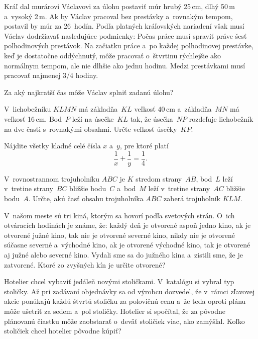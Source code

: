 {%
Kráľ dal murárovi Václavovi za úlohu postaviť múr hrubý 25\,cm, dlhý 50\,m a~vysoký 2\,m. Ak by Václav pracoval bez prestávky a~rovnakým tempom, postavil by múr za 26~hodín. Podľa platných kráľovských nariadení však musí Václav dodržiavať nasledujúce podmienky:
\itemitem{$\bullet$}
Počas práce musí spraviť práve šesť polhodinových prestávok.
\itemitem{$\bullet$}
Na začiatku práce a~po každej polhodinovej prestávke, keď je dostatočne oddýchnutý, môže pracovať o~štvrtinu rýchlejšie ako normálnym tempom, ale nie dlhšie ako jednu hodinu.
\itemitem{$\bullet$}
Medzi prestávkami musí pracovať najmenej 3/4 hodiny.

Za aký najkratší čas môže Václav splniť zadanú úlohu?
}

{%
V~lichobežníku $KLMN$ má základňa~$KL$ veľkosť 40\,cm a~základňa~$MN$ má veľkosť 16\,cm. Bod~$P$ leží na úsečke~$KL$ tak, že úsečka~$NP$ rozdeľuje lichobežník na dve časti s~rovnakými obsahmi. Určte veľkosť úsečky~$KP$.
}

{%
Nájdite všetky kladné celé čísla $x$ a~$y$, pre ktoré platí
$$
\frac1x+\frac1y=\frac14.
$$
}

{%
V~rovnostrannom trojuholníku $ABC$ je $K$ stredom strany~$AB$, bod~$L$ leží v~tretine strany~$BC$ bližšie bodu~$C$ a~bod~$M$ leží v~tretine strany~$AC$ bližšie bodu~$A$. Určte, akú časť obsahu trojuholníka $ABC$ zaberá trojuholník $KLM$.}

{%
V~našom meste sú tri kiná, ktorým sa hovorí podľa svetových strán. O~ich otváracích hodinách je známe, že:
\itemitem{$\bullet$}
každý deň je otvorené aspoň jedno kino,
\itemitem{$\bullet$}
ak je otvorené južné kino, tak nie je otvorené severné kino,
\itemitem{$\bullet$}
nikdy nie je otvorené súčasne severné a~východné kino,
\itemitem{$\bullet$}
ak je otvorené východné kino, tak je otvorené aj južné alebo severné kino.\endgraf
\noindent
Vydali sme sa do južného kina a~zistili sme, že je zatvorené. Ktoré zo zvyšných kín je určite otvorené?
}

{%
Hotelier chcel vybaviť jedáleň novými stoličkami. V~katalógu si vybral typ stoličky. Až pri zadávaní objednávky sa od výrobcu dozvedel, že v~rámci zľavovej akcie ponúkajú každú štvrtú stoličku za polovičnú cenu a~že teda oproti plánu môže ušetriť za sedem a~pol stoličky. Hotelier si spočítal, že za pôvodne plánovanú čiastku môže zaobstarať o~deväť stoličiek viac, ako zamýšľal. Koľko stoličiek chcel hotelier pôvodne kúpiť?}

